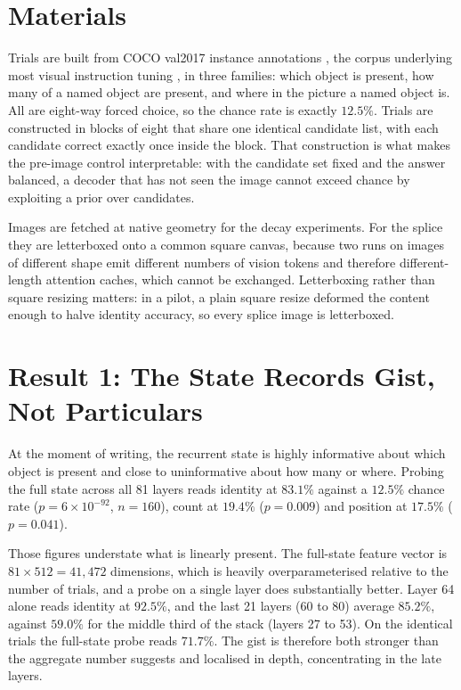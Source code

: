 \documentclass[11pt]{article}
\begin{document}
\section{Materials}

Trials are built from COCO val2017 instance annotations \cite{lin2014coco}, the
corpus underlying most visual instruction tuning \cite{liu2023llava}, in
three families: which object is present, how many of a named object are present,
and where in the picture a named object is. All are eight-way forced choice, so
the chance rate is exactly $12.5\%$. Trials are constructed in blocks of eight
that share one identical candidate list, with each candidate correct exactly
once inside the block. That construction is what makes the pre-image control
interpretable: with the candidate set fixed and the answer balanced, a decoder
that has not seen the image cannot exceed chance by exploiting a prior over
candidates.

Images are fetched at native geometry for the decay experiments. For the splice
they are letterboxed onto a common square canvas, because two runs on images of
different shape emit different numbers of vision tokens and therefore
different-length attention caches, which cannot be exchanged. Letterboxing
rather than square resizing matters: in a pilot, a plain square resize deformed
the content enough to halve identity accuracy, so every splice image is
letterboxed.

\section{Result 1: The State Records Gist, Not Particulars}

At the moment of writing, the recurrent state is highly informative about which
object is present and close to uninformative about how many or where. Probing
the full state across all 81 layers reads identity at $83.1\%$ against a
$12.5\%$ chance rate ($p = 6 \times 10^{-92}$, $n = 160$), count at $19.4\%$
($p = 0.009$) and position at $17.5\%$ ($p = 0.041$).

Those figures understate what is linearly present. The full-state feature vector
is $81 \times 512 = 41{,}472$ dimensions, which is heavily overparameterised
relative to the number of trials, and a probe on a single layer does
substantially better. Layer 64 alone reads identity at $92.5\%$, and the last
21 layers (60 to 80) average $85.2\%$, against $59.0\%$ for the middle third of
the stack (layers 27 to 53). On the identical trials the full-state probe reads $71.7\%$. The
gist is therefore both stronger than the aggregate number suggests and localised
in depth, concentrating in the late layers.
\end{document}
